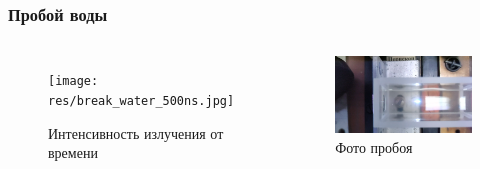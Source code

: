\documentclass{beamer}
\begin{document}
	\begin{frame}
		\frametitle{Пробой воды}
		\begin{columns}
			\begin{figure}
				\centering
				\texttt{[image: res/break\_water\_500ns.jpg]}
				\caption*{Интенсивность излучения от времени}
			\end{figure}	
			\begin{figure}
				\centering
				\includegraphics[width=\linewidth]{res/water_spark.png}
				\caption*{Фото пробоя}
			\end{figure}
		\end{columns}
	\end{frame}	
\end{document}
